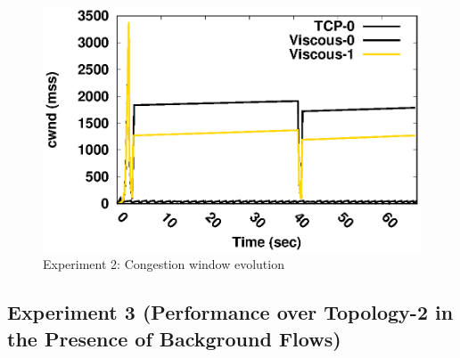 \begin{figure}[!t]
    \centering
    \includegraphics[width=\linewidth]{img/exp7/cwnd_sample2_10_20}
    \caption{Experiment 2: Congestion window evolution}
    \label{fig:exp7_cwnd}
\end{figure}

\subsection{Experiment 3 (Performance over Topology-2 in the Presence of Background Flows)}

%

